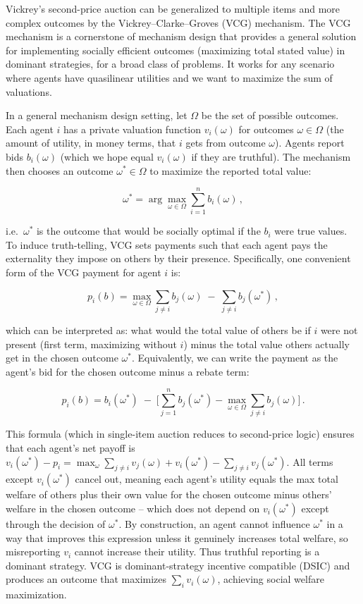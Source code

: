 \documentclass[
  letterpaper,
  numbers=noenddot,
  DIV=11]{scrreprt}
\theoremstyle{plain}
\theoremstyle{definition}
\theoremstyle{remark}
\begin{document}
Vickrey's second-price auction can be generalized to multiple items and
more complex outcomes by the Vickrey--Clarke--Groves (VCG) mechanism.
The VCG mechanism is a cornerstone of mechanism design that provides a
general solution for implementing socially efficient outcomes
(maximizing total stated value) in dominant strategies, for a broad
class of problems. It works for any scenario where agents have
quasilinear utilities and we want to maximize the sum of valuations.

In a general mechanism design setting, let \(\Omega\) be the set of
possible outcomes. Each agent \(i\) has a private valuation function
\(v_i(\omega)\) for outcomes \(\omega \in \Omega\) (the amount of
utility, in money terms, that \(i\) gets from outcome \(\omega\)).
Agents report bids \(b_i(\omega)\) (which we hope equal \(v_i(\omega)\)
if they are truthful). The mechanism then chooses an outcome
\(\omega^* \in \Omega\) to maximize the reported total value:

\[
\omega^* = \arg\max_{\omega \in \Omega} \sum_{i=1}^n b_i(\omega) \,,
\]

i.e.~\(\omega^*\) is the outcome that would be socially optimal if the
\(b_i\) were true values. To induce truth-telling, VCG sets payments
such that each agent pays the externality they impose on others by their
presence. Specifically, one convenient form of the VCG payment for agent
\(i\) is:

\[
p_i(b) = \max_{\omega \in \Omega} \sum_{j \neq i} b_j(\omega)\;-\;\sum_{j \neq i} b_j(\omega^*) \,,
\]

which can be interpreted as: what would the total value of others be if
\(i\) were not present (first term, maximizing without \(i\)) minus the
total value others actually get in the chosen outcome \(\omega^*\).
Equivalently, we can write the payment as the agent's bid for the chosen
outcome minus a rebate term:

\[
p_i(b) = b_i(\omega^*) \;-\; \Big[\sum_{j=1}^n b_j(\omega^*) - \max_{\omega \in \Omega} \sum_{j \neq i} b_j(\omega)\Big] \,. \tag{4.2}\label{eq-eq3.67}
\]

This formula (which in single-item auction reduces to second-price
logic) ensures that each agent's net payoff is
\(v_i(\omega^*) - p_i = \max_{\omega} \sum_{j\neq i} v_j(\omega) + v_i(\omega^*) - \sum_{j\neq i} v_j(\omega^*)\).
All terms except \(v_i(\omega^*)\) cancel out, meaning each agent's
utility equals the max total welfare of others plus their own value for
the chosen outcome minus others' welfare in the chosen outcome -- which
does not depend on \(v_i(\omega^*)\) except through the decision of
\(\omega^*\). By construction, an agent cannot influence \(\omega^*\) in
a way that improves this expression unless it genuinely increases total
welfare, so misreporting \(v_i\) cannot increase their utility. Thus
truthful reporting is a dominant strategy. VCG is dominant-strategy
incentive compatible (DSIC) and produces an outcome that maximizes
\(\sum_i v_i(\omega)\), achieving social welfare maximization.
\end{document}
